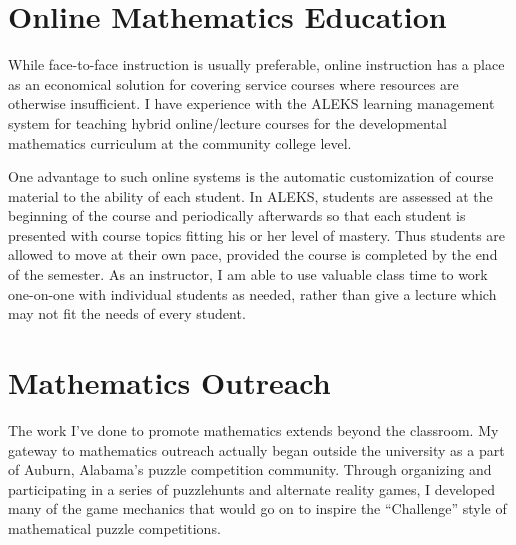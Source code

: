 \documentclass[11pt]{amsart}
\theoremstyle{plain}
\newcommand{\<}{\langle}
\renewcommand{\>}{\rangle}
\begin{document}
\section*{Online Mathematics Education}

While face-to-face instruction is usually preferable, online instruction has
a place as an economical solution for covering service courses where resources
are otherwise insufficient. I have experience with the ALEKS learning management
system for teaching hybrid online/lecture courses for the developmental
mathematics curriculum at the community college level.

One advantage to such online systems is the automatic customization of course
material to the ability of each student. In ALEKS, students are assessed at the
beginning of the course and periodically afterwards so that each student is
presented with course topics fitting his or her level of mastery. Thus students
are allowed to move at their own pace, provided the course is completed by
the end of the semester. As an instructor, I am able to use valuable class time
to work one-on-one with individual students as needed, rather than give
a lecture which may not fit the needs of every student.



\section*{Mathematics Outreach}

The work I've done to promote mathematics extends beyond the classroom. My
gateway to mathematics outreach actually began outside the university as a part
of Auburn, Alabama's puzzle competition community. Through organizing and
participating in a series of puzzlehunts and alternate reality games, I
developed many of the game mechanics that would go on to inspire the
``Challenge'' style of mathematical puzzle competitions.
\end{document}

